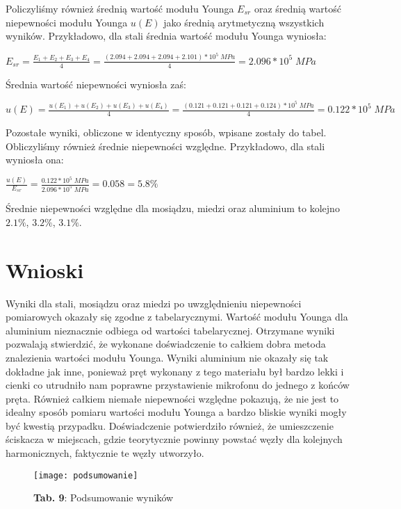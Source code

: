 \documentclass[12pt]{article}
\begin{document}
\noindent Policzyliśmy również średnią wartość modułu Younga $E_{sr}$ oraz średnią wartość niepewności modułu Younga $u(E)$ jako średnią arytmetyczną wszystkich wyników. Przykładowo, dla stali średnia wartość modułu Younga wyniosła:
\begin{center}
\Large $E_{sr}=\frac{E_1+E_2+E_3+E_4}{4}=\frac{(2.094+2.094+2.094+2.101)*10^5\;MPa}{4}=2.096*10^5\;MPa$
\end{center}
Średnia wartość niepewności wyniosła zaś:
\begin{center}
\Large $u(E)=\frac{u(E_1)+u(E_2)+u(E_3)+u(E_4)}{4}=\frac{(0.121+0.121+0.121+0.124)*10^5\;MPa}{4}=0.122*10^5\;MPa$
\end{center}
Pozostałe wyniki, obliczone w identyczny sposób, wpisane zostały do tabel. \newline
Obliczyliśmy również średnie niepewności względne. Przykładowo, dla stali wyniosła ona:
\begin{center}
\Large $\frac{u(E)}{E_{sr}}=\frac{0.122*10^5\;MPa}{2.096*10^5\;MPa}=0.058=5.8\%$
\end{center}
Średnie niepewności względne dla mosiądzu, miedzi oraz aluminium to kolejno $2.1\%$, $3.2\%$, $3.1\%$.
\section{Wnioski}
Wyniki dla stali, mosiądzu oraz miedzi po uwzględnieniu niepewności pomiarowych okazały się zgodne z tabelarycznymi. Wartość modułu Younga dla aluminium nieznacznie odbiega od wartości tabelarycznej. Otrzymane wyniki pozwalają stwierdzić, że wykonane doświadczenie to całkiem dobra metoda znalezienia wartości modułu Younga. Wyniki aluminium nie okazały się tak dokładne jak inne, ponieważ pręt wykonany z tego materiału był bardzo lekki i cienki co utrudniło nam poprawne przystawienie mikrofonu do jednego z końców pręta. Również całkiem niemałe niepewności względne pokazują, że nie jest to idealny sposób pomiaru wartości modułu Younga a bardzo bliskie wyniki mogły być kwestią przypadku. Doświadczenie potwierdziło również, że umieszczenie ściskacza w miejscach, gdzie teorytycznie powinny powstać węzły dla kolejnych harmonicznych, faktycznie te węzły utworzyło.
\begin{figure}[H]
\centering
\texttt{[image: podsumowanie]}
\caption*{\textbf{Tab. 9}: Podsumowanie wyników}
\end{figure} 
\end{document}

